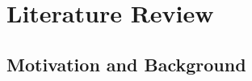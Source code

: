 \documentclass[print]{nuthesis}
\begin{document}

\tableofcontents

\listoffigures
\listoftables

\mainmatter


\hypertarget{literature-review}{%
\chapter{Literature Review}\label{literature-review}}

\hypertarget{motivation-and-background}{%
\section{Motivation and Background}\label{motivation-and-background}}
\end{document}
